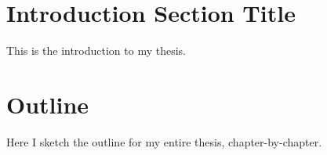 
\section{Introduction Section Title}

This is the introduction to my thesis.

\section{Outline}

Here I sketch the outline for my entire thesis, chapter-by-chapter.
